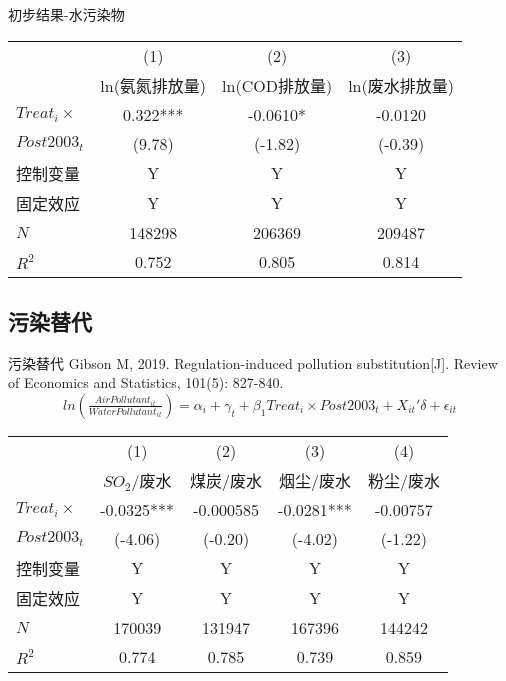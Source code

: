 \documentclass[11pt,compress,xcolor=x11names,UTF8]{beamer}
\begin{document}
\begin{frame}{初步结果-水污染物}
	
	
\begin{tabular}{l*{3}{c}}
	\hline\hline
	&\multicolumn{1}{c}{(1)}&\multicolumn{1}{c}{(2)}&\multicolumn{1}{c}{(3)}\\
	&\multicolumn{1}{c}{ln(氨氮排放量)}&\multicolumn{1}{c}{ln(COD排放量)}&\multicolumn{1}{c}{ln(废水排放量)}\\
	\hline
	$Treat_{i} \times$      &    0.322***&  -0.0610*  &  -0.0120   \\
	 $Post2003_{t}$ &   (9.78)   &  (-1.82)   &  (-0.39)   \\
		\hline
控制变量       &   Y&   Y&    Y \\
固定效应                 & Y  & Y   &  Y   \\
\hline
	\hline
	\(N\)     &   148298   &   206369   &   209487   \\
	\(R^{2}\) &    0.752   &    0.805   &    0.814   \\
	\hline\hline

\end{tabular}
	
\end{frame}

\subsection{污染替代}
\begin{frame}{污染替代}
	Gibson M, 2019. Regulation-induced pollution substitution[J]. Review of Economics and Statistics, 101(5): 827-840.
	\begin{equation}
	ln(\tfrac{AirPollutant_{it}}{WaterPollutant_{it}}) =\alpha_{i} + \gamma_{t} + \beta_1  Treat_{i} \times Post2003_{t} + X _{it}'\delta  + \epsilon_{it}
	\end{equation}  
\begin{tabular}{l*{4}{c}}
	\hline\hline
	&\multicolumn{1}{c}{(1)}&\multicolumn{1}{c}{(2)}&\multicolumn{1}{c}{(3)}&\multicolumn{1}{c}{(4)}\\
	&\multicolumn{1}{c}{$SO_2$/废水}&\multicolumn{1}{c}{煤炭/废水}&\multicolumn{1}{c}{烟尘/废水}&\multicolumn{1}{c}{粉尘/废水}\\
	\hline
	$Treat_{i} \times$       &  -0.0325***&-0.000585   &  -0.0281***& -0.00757   \\
	$Post2003_{t}$ &  (-4.06)   &  (-0.20)   &  (-4.02)   &  (-1.22)   \\
		\hline
控制变量       &   Y&   Y&   Y&  Y \\
固定效应                 & Y  & Y   &  Y   &  Y  \\
	\hline
	\(N\)     &   170039   &   131947   &   167396   &   144242   \\
	\(R^{2}\) &    0.774   &    0.785   &    0.739   &    0.859   \\
	\hline\hline

\end{tabular}
\end{frame}
\end{document}
